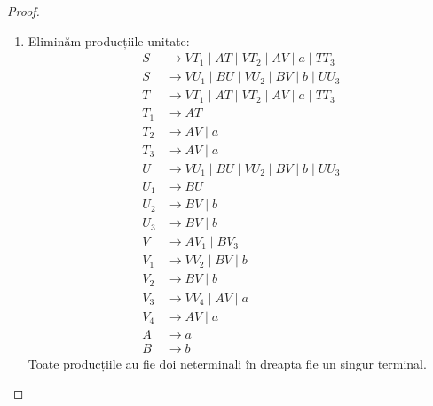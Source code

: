 \begin{proof}
\begin{enumerate}
        \item Eliminăm producțiile unitate:
              \begin{align*}
                  S   & \to V T_1 \mid AT \mid V T_2 \mid AV \mid a \mid T T_3 \\
                  S   & \to V U_1 \mid BU \mid V U_2 \mid BV \mid b \mid U U_3 \\
                  T   & \to V T_1 \mid AT \mid V T_2 \mid AV \mid a \mid T T_3 \\
                  T_1 & \to AT                                                 \\
                  T_2 & \to AV \mid a                                          \\
                  T_3 & \to AV \mid a                                          \\
                  U   & \to V U_1 \mid BU \mid V U_2 \mid BV \mid b \mid U U_3 \\
                  U_1 & \to BU                                                 \\
                  U_2 & \to BV \mid b                                          \\
                  U_3 & \to BV \mid b                                          \\
                  V   & \to A V_1 \mid B V_3                                   \\
                  V_1 & \to VV_2 \mid BV \mid b                                \\
                  V_2 & \to BV \mid b                                          \\
                  V_3 & \to VV_4 \mid AV \mid a                                \\
                  V_4 & \to AV \mid a                                          \\
                  A   & \to a                                                  \\
                  B   & \to b
              \end{align*}
              Toate producțiile au fie doi neterminali în dreapta fie un singur terminal.
    \end{enumerate}
\end{proof}
